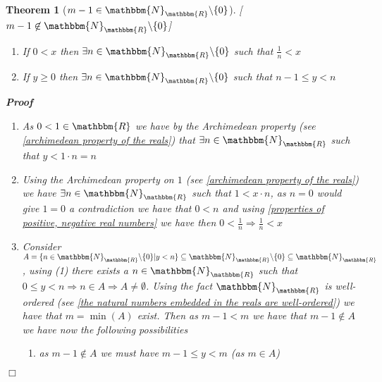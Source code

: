 \documentclass{book}
\newcommand{\nin}{\not\in}
\newcommand{\nobracket}{}
\newcommand{\um}{-}
\newenvironment{proof}{\noindent\textbf{Proof\ }}{\hspace*{\fill}$\Box$\medskip}
\newtheorem{theorem}{Theorem}
\begin{document}
{{\begin{theorem}[$m \um 1 \in \mathbbm{N}_{\mathbbm{R}} \backslash \{ 0 \}$][$m
\um 1 \nin \mathbbm{N}_{\mathbbm{R}} \backslash \{ 0 \}$]
\begin{enumerate}
    \item If $0 < x$ then $\exists n \in \mathbbm{N}_{\mathbbm{R}} \backslash
    \{ 0 \}$ such that $\frac{1}{n} < x$
    
    \item If $y \geqslant 0$ then $\exists n \in \mathbbm{N}_{\mathbbm{R}}
    \backslash \{ 0 \}$ such that $n \um 1 \leqslant y < n$
  \end{enumerate}
  \begin{proof}
    
    \begin{enumerate}
      \item As $0 < 1 \in \mathbbm{R}$ we have by the Archimedean property
      (see \ref{archimedean property of the reals}) that $\exists n \in
      \mathbbm{N}_{\mathbbm{R}}$ such that $y < 1 \cdot n = n$
      
      \item Using the Archimedean property on $1$ (see \ref{archimedean
      property of the reals}) we have $\exists n \in
      \mathbbm{N}_{\mathbbm{R}}$ such that $1 < x \cdot n$, as $n = 0$ would
      give $1 = 0$ a contradiction we have that $0 < n$ and using
      \ref{properties of positive, negative real numbers} we have then $0 <
      \frac{1}{n} \Rightarrow \frac{1}{n} < x$
      
      \item Consider $A = \{ n \in \mathbbm{N}_{\mathbbm{R}} \backslash \{ 0
      \} | y < n \nobracket \} \subseteq \mathbbm{N}_{\mathbbm{R}} \backslash
      \{ 0 \} \subseteq \mathbbm{N}_{\mathbbm{R}}$, using (1) there exists a
      $n \in \mathbbm{N}_{\mathbbm{R}}$ such that $0 \leqslant y < n
      \Rightarrow n \in A \Rightarrow A \neq \emptyset$. Using the fact
      $\mathbbm{N}_{\mathbbm{R}}$ is well-ordered (see \ref{the natural
      numbers embedded in the reals are well-ordered}) we have that $m = \min
      (A)$ exist. Then as $m \um 1 < m$ we have that $m \um 1 \nin A$ we have
      now the following possibilities
      \begin{enumerate}
        \item as $m \um 1 \nin A$ we must have $m \um 1 \leqslant y < m$ (as
        $m \in A$)
        

\end{enumerate}
\end{enumerate}
\end{proof}
\end{theorem}}}
\end{document}
